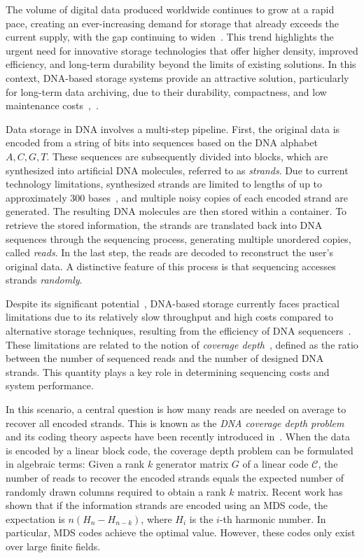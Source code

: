 \documentclass[11pt,a4paper,reqno,twoside]{article}
\theoremstyle{definition}
\newcommand{\mC}{\mathcal{C}}
\begin{document}
The volume of digital data produced worldwide continues to grow at a rapid pace, creating an ever-increasing demand for storage that already exceeds the current supply, with the gap continuing to widen~\cite{b1}. This trend highlights the urgent need for innovative storage technologies that offer higher density, improved efficiency, and long-term durability beyond the limits of existing solutions. In this context, DNA-based storage systems provide an attractive solution, particularly for long-term data archiving, due to their durability, compactness, and low maintenance costs~\cite{b2},~\cite{b3}. 

Data storage in DNA involves a multi-step pipeline. First, the original data is encoded from a string of bits into sequences based on the DNA alphabet ${A, C, G, T}$. These sequences are subsequently divided into blocks, which are synthesized into artificial DNA molecules, referred to as \textit{strands}.
Due to current technology limitations, synthesized strands are limited to lengths of up to approximately $300$ bases~\cite{synth_length}, and multiple noisy copies of each encoded strand are generated. The resulting DNA molecules are then stored within a container. To retrieve the stored information, the strands are translated back into DNA sequences through the sequencing process, generating multiple unordered copies, called \textit{reads}. 
In the last step, the reads are decoded to reconstruct the user’s original data. A distinctive feature of this process is that sequencing accesses strands \textit{randomly}.

Despite its significant potential~\cite{b4, b5, b6, b7, b8, b9, b10}, DNA-based storage currently faces practical limitations due to its relatively slow throughput and high costs compared to alternative storage techniques, resulting from the efficiency of DNA sequencers~\cite{b2, b11, b12}. These limitations are related to the notion of \textit{coverage depth}~\cite{b13}, defined as the ratio between the number of sequenced reads and the number of designed DNA strands. This quantity plays a key role in determining sequencing costs and system performance. 

In this scenario, a central question is how many reads are needed on average to recover all encoded strands. This is known as the \emph{DNA coverage depth problem} and its coding theory aspects have been recently introduced in~\cite{cover_your_bases}. When the data is encoded by a linear block code, the coverage depth problem can be formulated in algebraic terms: Given a rank $k$ generator matrix $G$ of a linear code $\mC$, the number of reads to recover the encoded strands equals the expected number of randomly drawn columns required to obtain a rank $k$ matrix. 
Recent work has shown that 
if the information strands are encoded using an MDS code, the expectation is $n(H_n - H_{n-k})$, where $H_i$ is the $i$-th harmonic number. In particular, MDS codes achieve the optimal value. However, these codes only exist over large finite fields. 
\end{document}
